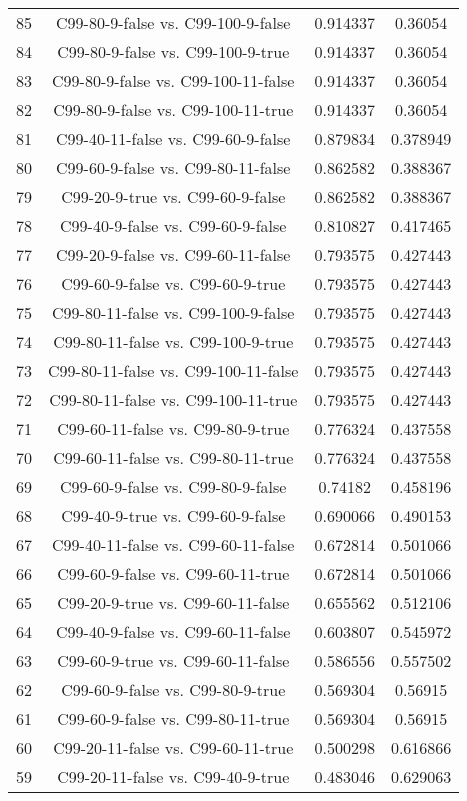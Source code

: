 \documentclass[a4paper,10pt]{article}
\begin{document}
\begin{landscape}
\begin{table}[!htp]
\begin{tabular}{cccc}
85&C99-80-9-false vs. C99-100-9-false&0.914337&0.36054\\
84&C99-80-9-false vs. C99-100-9-true&0.914337&0.36054\\
83&C99-80-9-false vs. C99-100-11-false&0.914337&0.36054\\
82&C99-80-9-false vs. C99-100-11-true&0.914337&0.36054\\
81&C99-40-11-false vs. C99-60-9-false&0.879834&0.378949\\
80&C99-60-9-false vs. C99-80-11-false&0.862582&0.388367\\
79&C99-20-9-true vs. C99-60-9-false&0.862582&0.388367\\
78&C99-40-9-false vs. C99-60-9-false&0.810827&0.417465\\
77&C99-20-9-false vs. C99-60-11-false&0.793575&0.427443\\
76&C99-60-9-false vs. C99-60-9-true&0.793575&0.427443\\
75&C99-80-11-false vs. C99-100-9-false&0.793575&0.427443\\
74&C99-80-11-false vs. C99-100-9-true&0.793575&0.427443\\
73&C99-80-11-false vs. C99-100-11-false&0.793575&0.427443\\
72&C99-80-11-false vs. C99-100-11-true&0.793575&0.427443\\
71&C99-60-11-false vs. C99-80-9-true&0.776324&0.437558\\
70&C99-60-11-false vs. C99-80-11-true&0.776324&0.437558\\
69&C99-60-9-false vs. C99-80-9-false&0.74182&0.458196\\
68&C99-40-9-true vs. C99-60-9-false&0.690066&0.490153\\
67&C99-40-11-false vs. C99-60-11-false&0.672814&0.501066\\
66&C99-60-9-false vs. C99-60-11-true&0.672814&0.501066\\
65&C99-20-9-true vs. C99-60-11-false&0.655562&0.512106\\
64&C99-40-9-false vs. C99-60-11-false&0.603807&0.545972\\
63&C99-60-9-true vs. C99-60-11-false&0.586556&0.557502\\
62&C99-60-9-false vs. C99-80-9-true&0.569304&0.56915\\
61&C99-60-9-false vs. C99-80-11-true&0.569304&0.56915\\
60&C99-20-11-false vs. C99-60-11-true&0.500298&0.616866\\
59&C99-20-11-false vs. C99-40-9-true&0.483046&0.629063\\

\end{tabular}
\end{table}
\end{landscape}
\end{document}
